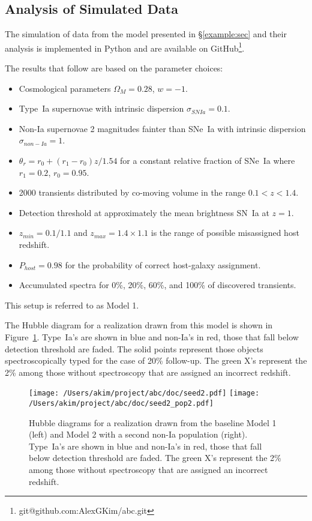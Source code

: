 \documentclass[preprint]{elsarticle}
\begin{document}
\subsection{Analysis of Simulated Data}
The simulation of data from the model presented in \S\ref{example:sec}
and their analysis is implemented in Python and are available
on GitHub\footnote{{git@github.com:AlexGKim/abc.git}}.

The results that follow are based on the parameter
choices:
\begin{itemize}
\item Cosmological parameters $\Omega_M=0.28$, $w=-1$.
\item Type~Ia supernovae with intrinsic dispersion $\sigma_{SNIa}=0.1$.
\item Non-Ia supernovae 2 magnitudes fainter than SNe~Ia with intrinsic
dispersion $\sigma_{non-Ia}=1$.
\item $\theta_r=r_0 + (r_1-r_0)z/1.54$ for a constant relative fraction of SNe~Ia where $r_1=0.2$,
$r_0=0.95$.
\item 2000 transients distributed by co-moving volume in the range $0.1<z<1.4$.
\item Detection threshold at approximately the mean brightness SN~Ia at $z=1$.
\item $z_{min}=0.1/1.1$ and $z_{max}=1.4\times 1.1$ is the range of possible misassigned
host redshift.
\item $P_{host}=0.98$ for the probability of correct host-galaxy assignment.
\item Accumulated spectra for 0\%, 20\%, 60\%, and 100\% of discovered transients.
\end{itemize}
This setup is referred to as Model 1.

The Hubble diagram for a realization drawn from this model is shown in Figure~\ref{hd:fig}.
Type~Ia's are shown in blue and non-Ia's in red, those that fall below detection threshold
are faded.  The solid points
represent those objects spectroscopically typed for the case of 20\% follow-up.
The green X's represent the 2\% among those without spectroscopy that
are assigned an incorrect redshift.

\begin{figure}[htbp] %
   \centering
   \texttt{[image: /Users/akim/project/abc/doc/seed2.pdf]}
   \texttt{[image: /Users/akim/project/abc/doc/seed2\_pop2.pdf]}  
\caption{Hubble diagrams for a realization drawn from the baseline Model 1 (left)
and Model 2 with a second non-Ia population (right).
Type~Ia's are shown in blue and non-Ia's in red, those that fall below detection threshold
are faded.  The green X's represent the 2\% among those without spectroscopy that
are assigned an incorrect redshift.
   \label{hd:fig}}
\end{figure}
\end{document}
